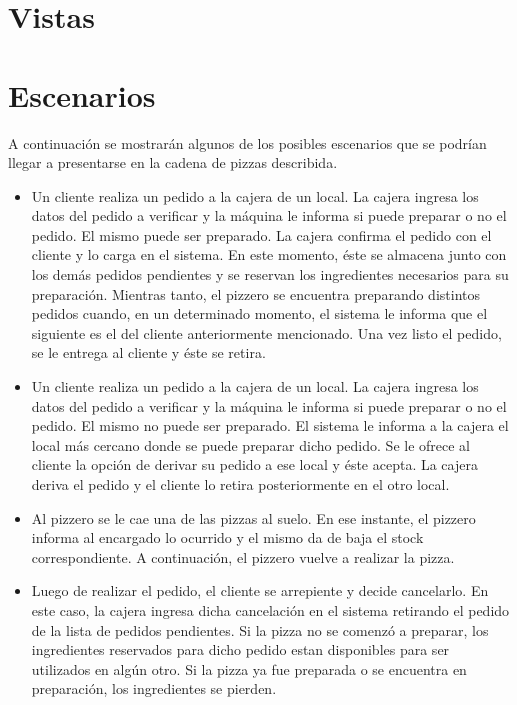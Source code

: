 \documentclass[a4paper,11pt] {article}
\begin{document}
\section*{Vistas}

\section*{Escenarios}
A continuaci\'on se mostrar\'an algunos de los posibles escenarios que se podr\'ian llegar a presentarse en la cadena de pizzas describida. 
\begin{itemize}
	\item Un cliente realiza un pedido a la cajera de un local. La cajera ingresa los datos del pedido a verificar y la m\'aquina le informa si puede preparar o no el pedido. El mismo puede ser preparado. La cajera confirma el pedido con el cliente y lo carga en el sistema. En este momento, \'este se almacena junto con los dem\'as pedidos pendientes y se reservan los ingredientes necesarios para su preparaci\'on. Mientras tanto, el pizzero se encuentra preparando distintos pedidos cuando, en un determinado momento, el sistema le informa que el siguiente es el del cliente anteriormente mencionado. Una vez listo el pedido, se le entrega al cliente y \'este se retira.
	\item Un cliente realiza un pedido a la cajera de un local. La cajera ingresa los datos del pedido a verificar y la m\'aquina le informa si puede preparar o no el pedido. El mismo no puede ser preparado. El sistema le informa a la cajera el local m\'as cercano donde se puede preparar dicho pedido. Se le ofrece al cliente la opci\'on de derivar su pedido a ese local y \'este acepta. La cajera deriva el pedido y el cliente lo retira posteriormente en el otro local.
	\item Al pizzero se le cae una de las pizzas al suelo. En ese instante, el pizzero informa al encargado lo ocurrido y el mismo da de baja el stock correspondiente. A continuación, el pizzero vuelve a realizar la pizza.
    \item Luego de realizar el pedido, el cliente se arrepiente y decide cancelarlo. En este caso, la cajera ingresa dicha cancelación en el sistema retirando el pedido de la lista de pedidos pendientes. Si la pizza no se comenz\'o a preparar, los ingredientes reservados para dicho pedido estan disponibles para ser utilizados en alg\'un otro. Si la pizza ya fue preparada o se encuentra en preparaci\'on, los ingredientes se pierden.
\end{itemize}
\end{document}
